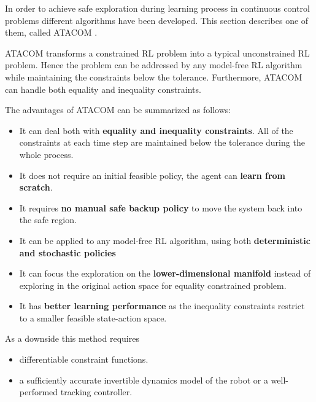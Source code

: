 In order to achieve safe exploration during learning process in continuous control problems different algorithms have been developed.
This section describes one of them, called ATACOM \cite{Atacom}.
 
ATACOM transforms a constrained RL problem into a typical unconstrained RL problem. Hence the problem can be addressed by any
model-free RL algorithm while maintaining the constraints below the tolerance. Furthermore, ATACOM can handle both equality and inequality
constraints.

The advantages of ATACOM can be summarized as follows:
\begin{itemize}
    \item It can deal both with \textbf{equality and inequality constraints}. All of the constraints at each time step are maintained
    below the tolerance during the whole process.
    \item It does not require an initial feasible policy, the agent can \textbf{learn from scratch}.
    \item It requires \textbf{no manual safe backup policy} to move the system back into the safe region.
    \item It can be applied to any model-free RL algorithm, using both \textbf{deterministic and stochastic policies}
    \item It can focus the exploration on the \textbf{lower-dimensional manifold} instead of exploring in the original action space
    for equality constrained problem.
    \item It has \textbf{better learning performance} as the inequality constraints restrict to a smaller feasible state-action space.
\end {itemize}

As a downside this method requires
\begin{itemize}
    \item differentiable constraint functions.
    \item a sufficiently accurate invertible dynamics model of the robot or a well-performed tracking controller.
\end{itemize}




